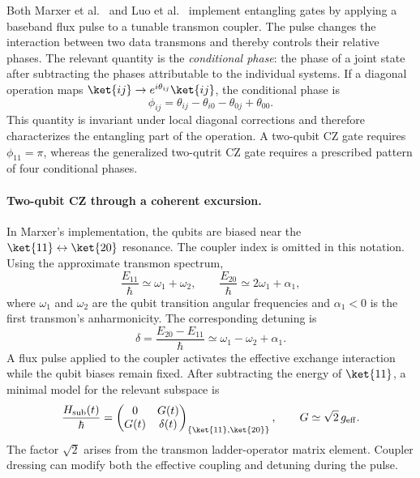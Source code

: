 Both Marxer et al.~\cite{Marxer2023} and Luo et al.~\cite{Luo2023}
implement entangling gates by applying a baseband flux pulse to a
tunable transmon coupler. The pulse changes the interaction between
two data transmons and thereby controls their relative phases.
The relevant quantity is the \emph{conditional phase}: the phase of
a joint state after subtracting the phases attributable to the
individual systems. If a diagonal operation maps
$\ket{ij}\rightarrow e^{i\theta_{ij}}\ket{ij}$, the conditional
phase is
\begin{equation}
    \phi_{ij}
    = \theta_{ij}-\theta_{i0}-\theta_{0j}+\theta_{00}.
    \label{eq:conditional-phase}
\end{equation}
This quantity is invariant under local diagonal corrections and
therefore characterizes the entangling part of the operation.
A two-qubit CZ gate requires $\phi_{11}=\pi$, whereas the
generalized two-qutrit CZ gate requires a prescribed pattern of
four conditional phases.

\paragraph{Two-qubit CZ through a coherent excursion.}

In Marxer's implementation, the qubits are biased near the
$\ket{11}\leftrightarrow\ket{20}$ resonance. The coupler index is
omitted in this notation. Using the approximate transmon spectrum,
\begin{equation}
    \frac{E_{11}}{\hbar}\simeq\omega_1+\omega_2,
    \qquad
    \frac{E_{20}}{\hbar}\simeq2\omega_1+\alpha_1,
\end{equation}
where $\omega_1$ and $\omega_2$ are the qubit transition angular
frequencies and $\alpha_1<0$ is the first transmon's anharmonicity.
The corresponding detuning is
\begin{equation}
    \delta
    = \frac{E_{20}-E_{11}}{\hbar}
    \simeq\omega_1-\omega_2+\alpha_1.
\end{equation}
A flux pulse applied to the coupler activates the effective
exchange interaction while the qubit biases remain fixed.
After subtracting the energy of $\ket{11}$, a minimal model for
the relevant subspace is
\begin{equation}
    \frac{H_{\mathrm{sub}}(t)}{\hbar}
    =
    \begin{pmatrix}
        0 & G(t)\\
        G(t) & \delta(t)
    \end{pmatrix}_{\{\ket{11},\ket{20}\}},
    \qquad
    G\simeq\sqrt{2}\,g_{\mathrm{eff}}.
    \label{eq:two-state-model}
\end{equation}
The factor $\sqrt{2}$ arises from the transmon ladder-operator
matrix element. Coupler dressing can modify both the effective
coupling and detuning during the pulse.

